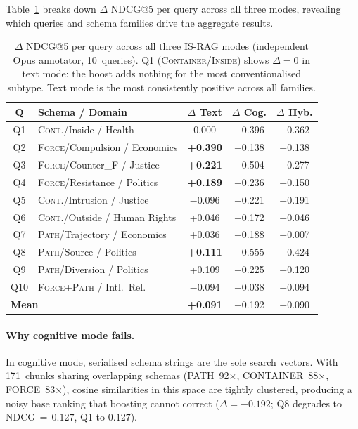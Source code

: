 \documentclass[11pt,a4paper]{article}
\begin{document}
Table~\ref{tab:modes_compare} breaks down $\Delta$ NDCG@5 per query
across all three modes, revealing which queries and schema families
drive the aggregate results.

\begin{table}[h]
\centering
\small
\setlength{\tabcolsep}{4pt}
\begin{tabular}{clccc}
\toprule
\textbf{Q} & \textbf{Schema / Domain} & \textbf{$\Delta$ Text} & \textbf{$\Delta$ Cog.} & \textbf{$\Delta$ Hyb.} \\
\midrule
Q1  & \textsc{Cont.}/Inside / Health            & 0.000           & $-$0.396        & $-$0.362 \\
Q2  & \textsc{Force}/Compulsion / Economics    & \textbf{+0.390} & +0.138          & +0.138 \\
Q3  & \textsc{Force}/Counter\_F / Justice      & \textbf{+0.221} & $-$0.504        & $-$0.277 \\
Q4  & \textsc{Force}/Resistance / Politics     & \textbf{+0.189} & +0.236          & +0.150 \\
\midrule
Q5  & \textsc{Cont.}/Intrusion / Justice       & $-$0.096        & $-$0.221        & $-$0.191 \\
Q6  & \textsc{Cont.}/Outside / Human Rights    & +0.046          & $-$0.172        & +0.046 \\
\midrule
Q7  & \textsc{Path}/Trajectory / Economics     & +0.036          & $-$0.188        & $-$0.007 \\
Q8  & \textsc{Path}/Source / Politics          & \textbf{+0.111} & $-$0.555        & $-$0.424 \\
Q9  & \textsc{Path}/Diversion / Politics       & +0.109          & $-$0.225        & +0.120 \\
\midrule
Q10 & \textsc{Force+Path} / Intl.\ Rel.        & $-$0.094        & $-$0.038        & $-$0.094 \\
\midrule
\multicolumn{2}{l}{\textbf{Mean}} & \textbf{+0.091} & $-$0.192 & $-$0.090 \\
\bottomrule
\end{tabular}
\caption{$\Delta$ NDCG@5 per query across all three IS-RAG modes
  (independent Opus annotator, 10~queries).
  Q1 (\textsc{Container}/\textsc{Inside}) shows $\Delta{=}0$ in text
  mode: the boost adds nothing for the most conventionalised subtype.
  Text mode is the most consistently positive across all families.}
\label{tab:modes_compare}
\end{table}

\paragraph{Why cognitive mode fails.}
In cognitive mode, serialised schema strings are the sole search
vectors.
With 171~chunks sharing overlapping schemas (PATH~92$\times$,
CONTAINER~88$\times$, FORCE~83$\times$), cosine similarities in this
space are tightly clustered, producing a noisy base ranking that
boosting cannot correct ($\Delta = -0.192$; Q8 degrades to
NDCG$\,{=}\,0.127$, Q1 to $0.127$).
\end{document}
